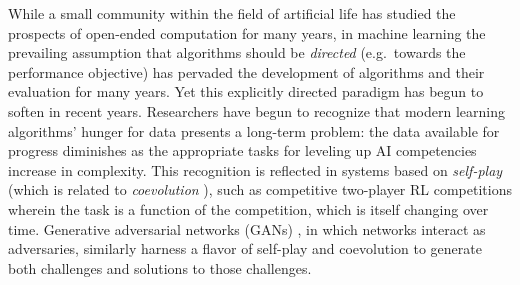 \documentclass{article}
\newcommand{\todo}[1]{\comments{\textcolor{red}{[TODO: #1]}}}
\newcommand{\jl}[1]{\comments{\textcolor{magenta}{[Joel: #1]}}}
\newcommand{\rw}[1]{\comments{\textcolor{blue}{[Rui: #1]}}}
\newcommand{\comments}[1]{#1}
\begin{document}
While a small community within the field of artificial life \cite{standish:ijcia03,langdon:metas05, lehman:alife08,graening:ppsn10,soros:alife14, soros2:alife14, brant:mcc17, ken:oriley17,ray:alife91,taylor:alife16}
has studied the prospects of open-ended computation for many years, in machine learning the prevailing assumption that algorithms should be \emph{directed} (e.g.\ towards the performance objective) has pervaded the development of algorithms and their evaluation for many years. Yet this explicitly directed paradigm has begun to soften in recent years. Researchers have begun to recognize that modern learning algorithms' hunger for data presents a long-term problem:  the data available for progress diminishes as the appropriate tasks for leveling up AI competencies increase in complexity. 
This recognition is reflected in systems based on \emph{self-play} (which is related to \emph{coevolution} \cite{ficici:alife98, wiegand:gecco01,popovici:hnc12}), such as competitive two-player RL competitions \cite{selfplay:arxiv18,silver2017mastering} wherein the task is a function of the competition, which is itself changing over time. Generative adversarial networks (GANs) \cite{goodfellow_generative_2014}, 
in which networks interact as adversaries, similarly harness a flavor of self-play and coevolution \cite{moran:arxiv18} %
to generate both challenges and solutions to those challenges. 
\end{document}
